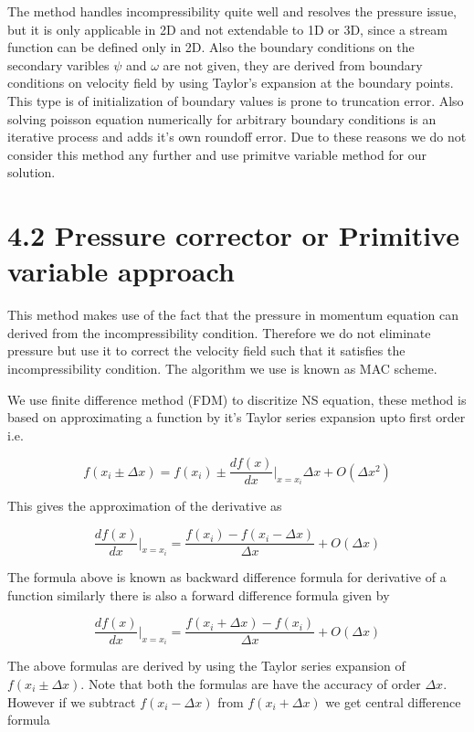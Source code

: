 \documentclass{article}		%
\begin{document}
The method handles incompressibility quite well and resolves the pressure issue, but it is only applicable in 2D and not extendable to 1D or 3D, since a stream function can be defined only in 2D. Also the boundary conditions on the secondary varibles $\psi$ and $\omega$ are not given, they are derived from boundary conditions on velocity field by  using Taylor's expansion at the boundary points. This type is of initialization of boundary values is prone to truncation error. Also solving poisson equation numerically for arbitrary boundary conditions is an iterative process and adds it's own roundoff error. Due to these reasons we do not consider this method any further and use primitve variable method for our solution.      

\section*{ 4.2 Pressure corrector or Primitive variable approach} 

This method makes use of the fact that the pressure in momentum equation can derived from the incompressibility condition. Therefore we do not eliminate pressure but use it to correct the velocity field such that it satisfies the incompressibility condition. The algorithm we use is known as MAC scheme. 

We use finite difference method (FDM) to discritize NS equation, these method is based on approximating a function by it's Taylor series expansion upto first order i.e.

$$
f(x_i \pm \Delta x) = f(x_i ) \pm \frac{df(x)}{dx} \bigg|_{x = x_i}  \Delta x + O(\Delta x^2)
$$ 

This gives the approximation of the derivative as 

\begin{equation}
\frac{df(x)}{dx} \bigg|_{x = x_i}  = \frac{f(x_{i}) - f(x_{i}- \Delta x) }{\Delta x} + O(\Delta x)
\end{equation} 

The formula above is known as backward difference formula for derivative of a function similarly there is also a forward difference formula given by 

\begin{equation}
\frac{df(x)}{dx} \bigg|_{x = x_i}  = \frac{f(x_{i} + \Delta x) - f(x_{i}) }{\Delta x} + O(\Delta x)
\end{equation} 

The above formulas are derived by using the Taylor series expansion of $f(x_i \pm \Delta x)$. Note that both the formulas are have the accuracy of order $\Delta x$. However if we subtract $ f(x_i - \Delta x) $ from $f(x_i + \Delta x) $ we get central difference formula 
\end{document}
